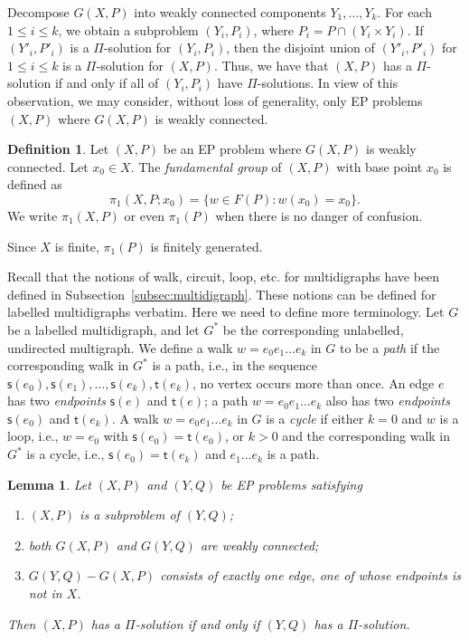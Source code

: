 \documentclass[10pt,a4paper]{amsart}
\newtheorem{lemma}[theorem]{Lemma}
\theoremstyle{definition}
\newtheorem{definition}[theorem]{Definition}
\theoremstyle{definition}
\numberwithin{equation}{section}
\begin{document}
Decompose $G(X, P)$ into weakly connected components $Y_1, \dots, Y_k$. For each $1\leq i\leq k$, we obtain a subproblem $(Y_i, P_i)$, where $P_i=P\cap (Y_i\times Y_i)$. If $(Y'_i, P'_i)$ is a $\Pi$-solution for $(Y_i, P_i)$, then the disjoint union of $(Y'_i, P'_i)$ for $1\leq i\leq k$ is a $\Pi$-solution for $(X, P)$. Thus, we have that $(X, P)$ has a $\Pi$-solution if and only if all of $(Y_i, P_i)$ have $\Pi$-solutions. In view of this observation, we may consider, without loss of generality, only EP problems $(X, P)$ where $G(X, P)$ is weakly connected. 

\begin{definition} Let $(X, P)$ be an EP problem where $G(X, P)$ is weakly connected. Let $x_0\in X$. The {\em fundamental group} of $(X, P)$ with base point $x_0$ is defined as
$$ \pi_1(X, P; x_0)=\{w\in F(P)\colon w(x_0)=x_0\}. $$
We write $\pi_1(X, P)$ or even $\pi_1(P)$ when there is no danger of confusion.
\end{definition}

Since $X$ is finite, $\pi_1(P)$ is finitely generated. 

Recall that the notions of walk, circuit, loop, etc. for multidigraphs have been defined in Subsection~\ref{subsec:multidigraph}.  These notions can be defined for labelled multidigraphs verbatim. Here we need to define more terminology. Let $G$ be a labelled multidigraph, and let $G^*$ be the corresponding unlabelled, undirected multigraph. We define a walk $w=e_0e_1\dots e_k$ in $G$ to be a {\em path} if the corresponding walk in $G^*$ is a path, i.e., in the sequence $\mathsf{s}(e_0), \mathsf{s}(e_1), \dots, \mathsf{s}(e_k), \mathsf{t}(e_k)$, no vertex occurs more than once. An edge $e$ has two {\em endpoints} $\mathsf{s}(e)$ and $\mathsf{t}(e)$; a path $w=e_0e_1\dots e_k$ also has two {\em endpoints} $\mathsf{s}(e_0)$ and $\mathsf{t}(e_k)$. A walk $w=e_0e_1\dots e_k$ in $G$ is a {\em cycle} if either $k=0$ and $w$ is a loop, i.e., $w=e_0$ with $\mathsf{s}(e_0)=\mathsf{t}(e_0)$, or $k>0$ and the corresponding walk in $G^*$ is a cycle, i.e., $\mathsf{s}(e_0)=\mathsf{t}(e_k)$ and $e_1\dots e_k$ is a path. 

\begin{lemma}\label{lem:singleedgeextension} Let $(X, P)$ and $(Y, Q)$ be EP problems satisfying
\begin{enumerate}
\item[\rm (a)] $(X, P)$ is a subproblem of $(Y, Q)$; 
\item[\rm (b)] both $G(X, P)$ and $G(Y, Q)$ are weakly connected;
\item[\rm (c)]  $G(Y, Q)-G(X, P)$ consists of exactly one edge, one of whose endpoints is not in $X$.
\end{enumerate}
Then $(X, P)$ has a $\Pi$-solution if and only if $(Y, Q)$ has a $\Pi$-solution.
\end{lemma}
\end{document}
